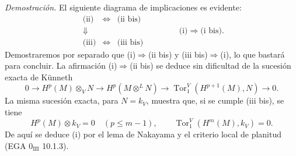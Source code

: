 \emph{Demostración.} El siguiente diagrama de implicaciones es evidente:
\[
\begin{array}{ccc}
\text{(ii)}&\Leftrightarrow&\text{(ii bis)}\\
\Downarrow&&\\
\text{(iii)}&\Leftrightarrow&\text{(iii bis)}
\end{array}
\qquad\qquad
\text{(i)}\Rightarrow\text{(i bis).}
\]
Demostraremos por separado que (i)$\Rightarrow$(ii bis) y (iii bis)$\Rightarrow$(i), lo que bastará para concluir. La afirmación (i)$\Rightarrow$(ii bis) se deduce sin dificultad de la sucesión exacta de Künneth
\[
0\to H^p(M)\otimes_V N\to H^p(M\otimes^L N)\to \operatorname{Tor}_1^V(H^{p+1}(M),N)\to0.
\]
La misma sucesión exacta, para $N=k_V$, muestra que, si se cumple (iii bis), se tiene
\[
H^p(M)\otimes k_V=0\quad(p\le m-1),\qquad
\operatorname{Tor}_1^V(H^m(M),k_V)=0.
\]
De aquí se deduce (i) por el lema de Nakayama y el criterio local de planitud (EGA $0_{\mathrm{III}}$ 10.1.3).
